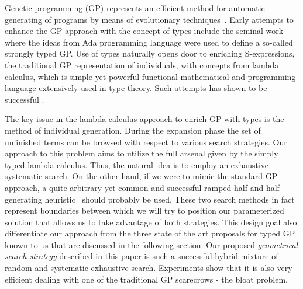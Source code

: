 \documentclass{llncs}
\begin{document}
Genetic programming (GP) represents an efficient method for automatic generating of programs by means of evolutionary techniques~\cite{koza92,koza03}. Early attempts to enhance the GP approach with the concept of types include the seminal work~\cite{montana95} where the ideas from Ada programming language were used to define a so-called strongly typed GP.   
Use of types naturally opens door to enriching S-expressions,
the traditional GP representation of individuals, with concepts from
lambda calculus, which is simple yet powerful functional mathematical and programming 
language extensively used in type theory. Such attempts has shown to be 
successful \cite{yu01}. 

The key issue in the lambda calculus approach to enrich GP with types is the method of individual generation. During the expansion phase the set of unfinished terms can be browsed with respect to various search strategies. Our approach to this problem aims to utilize the full arsenal given by the simply typed lambda calculus. Thus, the natural idea is to employ an exhaustive systematic search. On the other hand, if we were to mimic the standard GP approach, a quite arbitrary yet common and successful ramped half-and-half generating heuristic~\cite{fg} should probably be used.  
These two search methods in fact represent boundaries between which we will try to position our parameterized solution that allows us to take advantage of both strategies. This design goal also differentiate our approach from 
the three state of the art proposals for typed GP known to us that are discussed in the following section. 
Our proposed \emph{geometrical search strategy} described in this paper is such a successful hybrid mixture of random and systematic exhaustive search. Experiments show that it is also very efficient dealing with one of the traditional GP scarecrows - the bloat problem.


%
\end{document}

